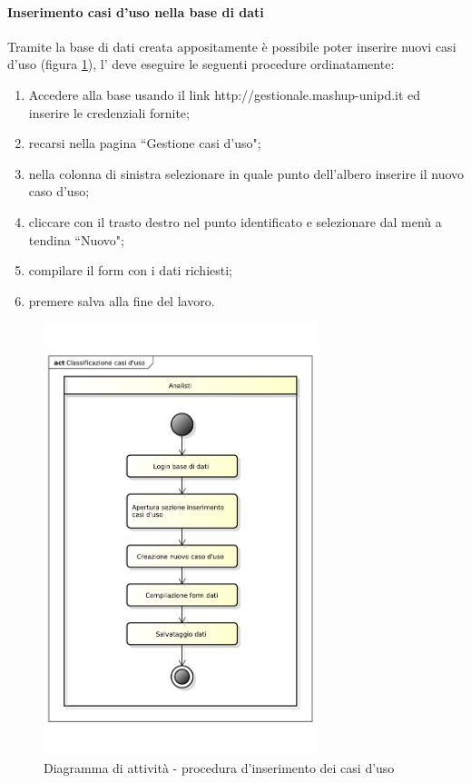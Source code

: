 			\paragraph{Inserimento casi d'uso nella base di dati}
			Tramite la base di dati creata appositamente è possibile poter inserire nuovi casi d'uso (figura \ref{fig:procedura_inserimento_uc}), l'\roleAnalyst{} deve eseguire le seguenti procedure ordinatamente:

				\begin{enumerate}
			 		\item Accedere alla base usando il link http://gestionale.mashup-unipd.it ed inserire le credenziali fornite;
			 		\item recarsi nella pagina ``Gestione casi d'uso";
					\item nella colonna di sinistra selezionare in quale punto dell'albero inserire il nuovo caso d'uso;
					\item cliccare con il trasto destro nel punto identificato e selezionare dal menù a tendina ``Nuovo";
					\item compilare il form con i dati richiesti;
					\item premere salva alla fine del lavoro.
			 	\end{enumerate}

			 	\begin{figure}
					\centering
					\includegraphics[width=8cm]{images/classificazione_uc.pdf}
					\caption{Diagramma di attività - procedura d'inserimento dei casi d'uso}
					\label{fig:procedura_inserimento_uc}
				\end{figure}


